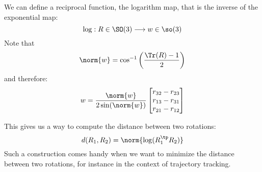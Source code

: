 We can define a reciprocal function, the logarithm map, that is the inverse of the exponential map:
\begin{equation*}
    \log:R\in\SO(3)\longrightarrow w\in\so(3)
\end{equation*}
Note that
\begin{equation*}
    \norm{w}=\cos^{-1}\left(\frac{\Tr(R)-1}{2}\right)
\end{equation*}
and therefore:
\begin{equation*}
    w=\frac{\norm{w}}{2\sin(\norm{w})}\begin{bmatrix}
        r_{32}-r_{23} \\
        r_{13}-r_{31} \\
        r_{21}-r_{12}
    \end{bmatrix}
\end{equation*}

This gives us a way to compute the distance between two rotations:
\begin{equation*}
    d(R_1, R_2) = \norm{\log(R_1^\tp R_2)}
\end{equation*}
Such a construction comes handy when we want to minimize the distance between two rotations, for instance in the context of trajectory tracking.